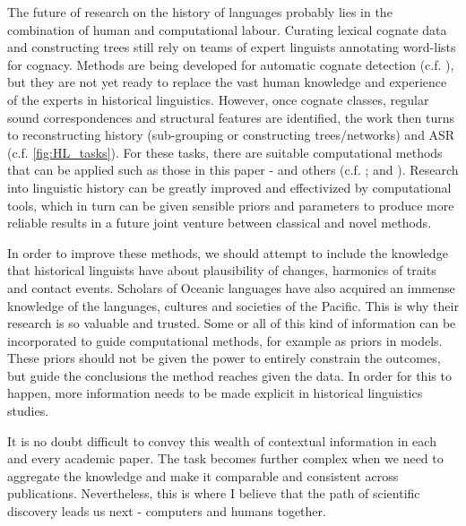 \documentclass[12pt,letterpaper]{article}
\begin{document}


The future of research on the history of languages probably lies in the combination of human and computational labour. Curating lexical cognate data \citep{list2022lexibank} and constructing trees \citep{grayetal_2009} still rely on teams of expert linguists annotating word-lists for cognacy. Methods are being developed for automatic cognate detection (c.f. \citet{list2017potential}), but they are not yet ready to replace the vast human knowledge and experience of the experts in historical linguistics. However, once cognate classes, regular sound correspondences and structural features are identified, the work then turns to reconstructing history (sub-grouping or constructing trees/networks) and ASR (c.f. \ref{fig:HL_tasks}). For these tasks, there are suitable computational methods that can be applied such as those in this paper - and others (c.f. \citet{greenhill2015evolution}; \citet{gray_greenhill_defend_bayes} and \citet{joy2016ancestral}). Research into linguistic history can be greatly improved and effectivized by computational tools, which in turn can be given sensible priors and parameters to produce more reliable results in a future joint venture between classical and novel methods.

In order to improve these methods, we should attempt to include the knowledge that historical linguists have about plausibility of changes, harmonics of traits and contact events. Scholars of Oceanic languages have also acquired an immense knowledge of the languages, cultures and societies of the Pacific. This is why their research is so valuable and trusted. Some or all of this kind of information can be incorporated to guide computational methods, for example as priors in models. These priors should not be given the power to entirely constrain the outcomes, but guide the conclusions the method reaches given the data. In order for this to happen, more information needs to be made explicit in historical linguistics studies.

It is no doubt difficult to convey this wealth of contextual information in each and every academic paper. The task becomes further complex when we need to aggregate the knowledge and make it comparable and consistent across publications. Nevertheless, this is where I believe that the path of scientific discovery leads us next - computers and humans together.
\end{document}
